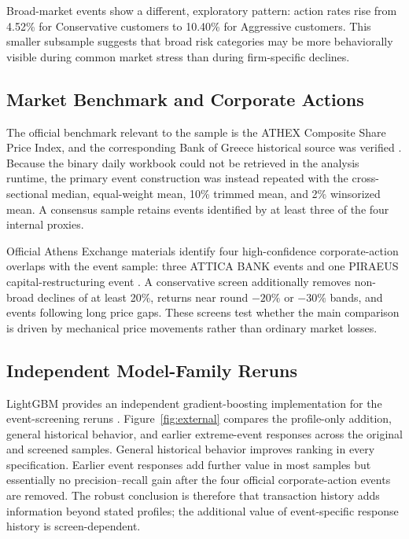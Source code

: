 \documentclass[conference]{IEEEtran}
\newcommand{\pct}{\%}
\begin{document}
Broad-market events show a different, exploratory pattern: action rates rise from 4.52\pct{} for Conservative customers to 10.40\pct{} for Aggressive customers. This smaller subsample suggests that broad risk categories may be more behaviorally visible during common market stress than during firm-specific declines.

\subsection{Market Benchmark and Corporate Actions}
The official benchmark relevant to the sample is the ATHEX Composite Share Price Index, and the corresponding Bank of Greece historical source was verified \cite{athex2026composite,bankofgreece2026indices}. Because the binary daily workbook could not be retrieved in the analysis runtime, the primary event construction was instead repeated with the cross-sectional median, equal-weight mean, 10\pct{} trimmed mean, and 2\pct{} winsorized mean. A consensus sample retains events identified by at least three of the four internal proxies.

Official Athens Exchange materials identify four high-confidence corporate-action overlaps with the event sample: three ATTICA BANK events and one PIRAEUS capital-restructuring event \cite{athex2026actions}. A conservative screen additionally removes non-broad declines of at least 20\pct{}, returns near round $-20\pct{}$ or $-30\pct{}$ bands, and events following long price gaps. These screens test whether the main comparison is driven by mechanical price movements rather than ordinary market losses.

\subsection{Independent Model-Family Reruns}
LightGBM provides an independent gradient-boosting implementation for the event-screening reruns \cite{ke2017lightgbm}. Figure~\ref{fig:external} compares the profile-only addition, general historical behavior, and earlier extreme-event responses across the original and screened samples. General historical behavior improves ranking in every specification. Earlier event responses add further value in most samples but essentially no precision--recall gain after the four official corporate-action events are removed. The robust conclusion is therefore that transaction history adds information beyond stated profiles; the additional value of event-specific response history is screen-dependent.
\end{document}
